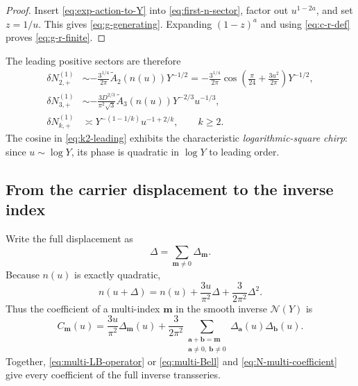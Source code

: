 \documentclass[11pt]{article}
\numberwithin{equation}{section}
\theoremstyle{mainthm}
\theoremstyle{defstyle}
\theoremstyle{remark}
\newcommand{\Ncal}{\mathcal N}
\begin{document}
\begin{proof}
Insert \eqref{eq:exp-action-to-Y} into \eqref{eq:first-n-sector}, factor out \(u^{1-2a}\), and set \(z=1/u\).  This gives \eqref{eq:g-generating}.  Expanding \((1-z)^a\) and using \eqref{eq:c-r-def} proves \eqref{eq:g-r-finite}.
\end{proof}

The leading positive sectors are therefore
\begin{align}
 \delta N_{2,+}^{(1)}
 &\sim-\frac{3^{1/4}}{2\pi}
 \widetilde A_2(n(u))Y^{-1/2}
 =-\frac{3^{1/4}}{2\pi}
 \cos\!\left(\frac\pi{24}+\frac{3u^2}{2\pi}\right)Y^{-1/2},
 \label{eq:k2-leading}\\
 \delta N_{3,+}^{(1)}
 &\sim-\frac{3D^{2/3}}{\pi^2\sqrt3}
 \widetilde A_3(n(u))Y^{-2/3}u^{-1/3},
 \label{eq:k3-leading}\\
 \delta N_{k,+}^{(1)}
 &\asymp Y^{-(1-1/k)}u^{-1+2/k},
 \qquad k\ge2.
 \label{eq:k-general-leading}
\end{align}
The cosine in \eqref{eq:k2-leading} exhibits the characteristic \emph{logarithmic-square chirp}: since \(u\sim\log Y\), its phase is quadratic in \(\log Y\) to leading order.

\subsection{From the carrier displacement to the inverse index}

Write the full displacement as
\begin{equation}\label{eq:Delta-sum}
 \Delta=\sum_{\bm m\ne0}\Delta_{\bm m}.
\end{equation}
Because \(n(u)\) is exactly quadratic,
\begin{equation}\label{eq:n-Delta-exact}
 n(u+\Delta)=n(u)+\frac{3u}{\pi^2}\Delta
 +\frac{3}{2\pi^2}\Delta^2.
\end{equation}
Thus the coefficient of a multi-index \(\bm m\) in the smooth inverse \(\Ncal(Y)\) is
\begin{equation}\label{eq:N-multi-coefficient}
 \boxed{
 C_{\bm m}(u)=\frac{3u}{\pi^2}\Delta_{\bm m}(u)
 +\frac{3}{2\pi^2}
 \sum_{\substack{\bm a+\bm b=\bm m\\
                  \bm a\ne0,\ \bm b\ne0}}
 \Delta_{\bm a}(u)\Delta_{\bm b}(u).}
\end{equation}
Together, \eqref{eq:multi-LB-operator} or \eqref{eq:multi-Bell} and \eqref{eq:N-multi-coefficient} give every coefficient of the full inverse transseries.
\end{document}
